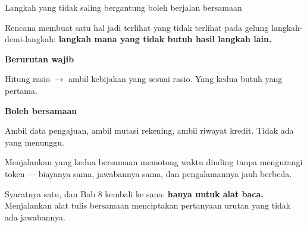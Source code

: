 \documentclass[aspectratio=169,11pt,t]{beamer}
\begin{document}
\begin{frame}[shrink=25]{Langkah yang tidak saling bergantung boleh berjalan bersamaan}
{\fontsize{9.4}{12.6}\selectfont\color{fg2}Rencana membuat satu hal jadi terlihat yang tidak terlihat pada gelung langkah-demi-langkah: \textbf{langkah mana yang tidak butuh hasil langkah lain.}\par}\vskip 4pt
\begin{minipage}[t]{0.485\textwidth}
{\fontsize{9.4}{12.6}\selectfont\color{fg2}\textbf{Berurutan wajib}\par}\vskip 4pt
{\fontsize{9.4}{12.6}\selectfont\color{fg2}Hitung rasio $\rightarrow$ ambil kebijakan yang sesuai rasio. Yang kedua butuh yang pertama.\par}\vskip 4pt

\end{minipage}%
\hfill
\begin{minipage}[t]{0.485\textwidth}
{\fontsize{9.4}{12.6}\selectfont\color{fg2}\textbf{Boleh bersamaan}\par}\vskip 4pt
{\fontsize{9.4}{12.6}\selectfont\color{fg2}Ambil data pengajuan, ambil mutasi rekening, ambil riwayat kredit. Tidak ada yang menunggu.\par}\vskip 4pt

\end{minipage}%
{\fontsize{9.4}{12.6}\selectfont\color{fg2}Menjalankan yang kedua bersamaan memotong waktu dinding tanpa mengurangi token --- biayanya sama, jawabannya sama, dan pengalamannya jauh berbeda.\par}\vskip 4pt
\begin{iband}[signal]
Syaratnya satu, dan Bab 8 kembali ke sana: \textbf{hanya untuk alat baca.} Menjalankan alat tulis bersamaan menciptakan pertanyaan urutan yang tidak ada jawabannya.
\end{iband}
\end{frame}

\end{document}
